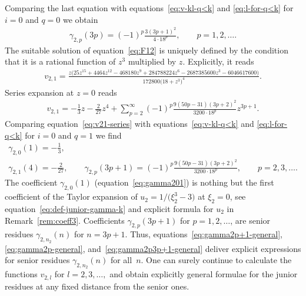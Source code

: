 \documentclass[pdftex]{sigma}
\numberwithin{equation}{section}
\begin{document}
Comparing the last equation with equations~\eqref{eq:v-kl-q<k} and \eqref{eq:l-for-q<k} for $i=0$ and $q=0$ we obtain
\begin{gather}\label{eq:gamma2p-general}
\gamma_{2,p}(3p)=(-1)^p \frac{3(3p+1)^2}{4\cdot18^p},\qquad p=1,2,\ldots.
\end{gather}
The suitable solution of equation~\eqref{eq:F12} is uniquely defined by the condition that it is a rational
function of $z^3$ multiplied by $z$. Explicitly, it reads
\begin{gather*}
v_{2,1}=\frac{z\big(25z^{15}+4464z^{12}-468180z^9+284788224z^6-2687385600z^3-6046617600\big)}{172800\big(18+z^3\big)^4}.
\end{gather*}
Series expansion at $z=0$ reads
\begin{gather}\label{eq:v21-series}
v_{2,1}=-\frac13z-\frac2{27}z^4+\sum_{p=2}^\infty(-1)^p\frac{9(50p-31)(3p+2)^2}{3200\cdot18^p}z^{3p+1}.
\end{gather}
Comparing equation~\eqref{eq:v21-series} with equations~\eqref{eq:v-kl-q<k} and \eqref{eq:l-for-q<k}
for $i=0$ and $q=1$ we find
\begin{gather}
\gamma_{2,0}(1)=-\frac13,\label{eq:gamma201}\\
\gamma_{2,1}(4)=-\frac2{27},\qquad
\gamma_{2,p}(3p+1)=(-1)^p\frac{9(50p-31)(3p+2)^2}{3200\cdot18^p},\qquad
p=2,3,\ldots.\label{eq:gamma2p3p+1-general}
\end{gather}
The coefficient $\gamma_{2,0}(1)$ (equation~\eqref{eq:gamma201}) is nothing but the first coefficient of the
Taylor expansion of $u_2=1/\big(\xi_2^3-3\big)$ at $\xi_2=0$, see equation~\eqref{eq:def-junior-gamma-k} and explicit
formula for $u_2$ in Remark~\ref{rem:coeff3}. Coefficients $\gamma_{2,p}(3p+1)$ for $p=1,2,\ldots$, are
senior residues $\gamma_{2,n_2}(n)$ for $n=3p+1$. Thus,
equations~\eqref{eq:gamma2p+1-general}, \eqref{eq:gamma2p-general}, and~\eqref{eq:gamma2p3p+1-general}
deliver explicit expressions for senior residues $\gamma_{2,n_2}(n)$ for all~$n$. One can surely continue to
calculate the functions $v_{2,l}$ for $l=2,3,\ldots,$ and obtain explicitly general formulae for the junior
residues at any fixed distance from the senior ones.
\end{document}
